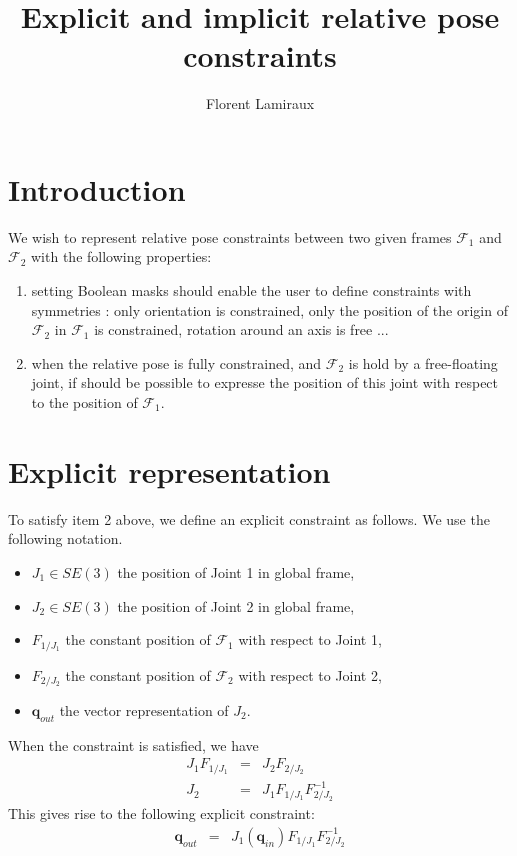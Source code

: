 \documentclass {article}
\title {Explicit and implicit relative pose constraints}
\author {Florent Lamiraux}
\date {}
\newcommand\conf{\mathbf{q}}
\newcommand\fr{\mathcal{F}}
\begin{document}
\maketitle

\section {Introduction}

We wish to represent relative pose constraints between two given frames $\fr_1$ and $\fr_2$ with the following properties:
\begin{enumerate}
\item setting Boolean masks should enable the user to define constraints with
  symmetries : only orientation is constrained, only the position of the origin of $\fr_2$ in $\fr_1$ is constrained, rotation around an axis is free ...
\item when the relative pose is fully constrained, and $\fr_2$ is hold by a free-floating joint, if should be possible to expresse the position of this joint with respect to the position of $\fr_1$.
\end{enumerate}

\section {Explicit representation}

To satisfy item 2 above, we define an explicit constraint as follows. We use the following notation.
\begin {itemize}
\item $J_1\in SE(3)$ the position of Joint 1 in global frame,
\item $J_2\in SE(3)$ the position of Joint 2 in global frame,
\item $F_{1/J_1}$ the constant position of $\fr_1$ with respect to Joint 1,
\item $F_{2/J_2}$ the constant position of $\fr_2$ with respect to Joint 2,
\item $\conf_{out}$ the vector representation of $J_2$.
\end {itemize}
When the constraint is satisfied, we have
\begin {eqnarray*}
  J_1 F_{1/J_1} &=& J_2 F_{2/J_2} \\
  J_2 &=& J_1 F_{1/J_1} F_{2/J_2}^{-1}
\end {eqnarray*}
This gives rise to the following explicit constraint:
\begin {eqnarray*}
  \conf_{out} &=& {J_1} (\conf_{in}) F_{1/J_1} F_{2/J_2}^{-1}
\end {eqnarray*}
\end{document}
